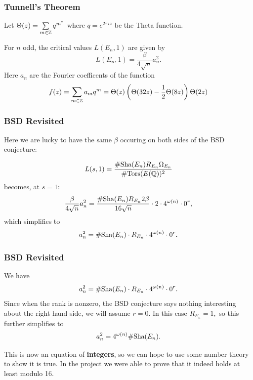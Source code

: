 \message{ !name(presentation.tex)}\documentclass{beamer}
\begin{document}
\begin{frame}
  \frametitle{Tunnell's Theorem}
  Let $\Theta(z) = \sum\limits_{m \in {\mathbb Z}} q^{m^2}$ where $q = e^{2 \pi i z}$ be
  the Theta function. \pause
  \begin{theorem}
    For $n$ odd, the critical values $L(E_n,1)$ are given by
    \[L(E_n,1) = \frac{\beta}{4\sqrt{n}} a_n^2.\]
    Here $a_n$ are the Fourier coefficents of the function
    \[f(z) = \sum\limits_{m \in {\mathbb Z}} a_m q^m = \Theta(z) \left( \Theta(32z)
      - \frac{1}{2}\Theta(8z)\right) \Theta(2z)\]
  \end{theorem}
\end{frame}

\begin{frame}
  \frametitle{BSD Revisited}
  Here we are lucky to have the same $\beta$ occuring on both sides of the BSD
  conjecture: 

  \[L(s,1) = \frac{\# \text{\normalfont Sha}(E_n) R_{E_n} \Omega_{E_n}}{\#{\text{\normalfont Tors}}(E({\mathbb Q}))^2}\] 
  becomes, at $s = 1$: \pause
  \[\frac{\beta}{4 \sqrt{n}} a_n^2 = \frac{\# \text{\normalfont Sha}(E_n) R_{E_n} 2 \beta}{
      16 \sqrt{n}} \cdot 2 \cdot 4^{\omega(n)} \cdot 0^r,\] \pause
  which simplifies to
  \[a_n^2 = \# \text{\normalfont Sha}(E_n) \cdot R_{E_n} \cdot 4^{\omega(n)} \cdot 0^r.\]

\end{frame}

\begin{frame}
  \frametitle{BSD Revisited}
  We have
  \[a_n^2 = \# \text{\normalfont Sha}(E_n) \cdot R_{E_n} \cdot 4^{\omega(n)} \cdot 0^r.\]
  Since when the rank is nonzero, the BSD conjecture says nothing interesting
  about the right hand side, we will assume $r = 0$. In this case $R_{E_n} = 1,$
  so this further simplifies to
  \[a_n^2 = 4^{\omega(n)} \# \text{\normalfont Sha}(E_n).\] \pause

  This is now an equation of \textbf{integers}, so we can hope to use some
  number theory to show it is true. In the project we were able to prove that it
  indeed holds at least modulo 16.
\end{frame}

\end{document}

